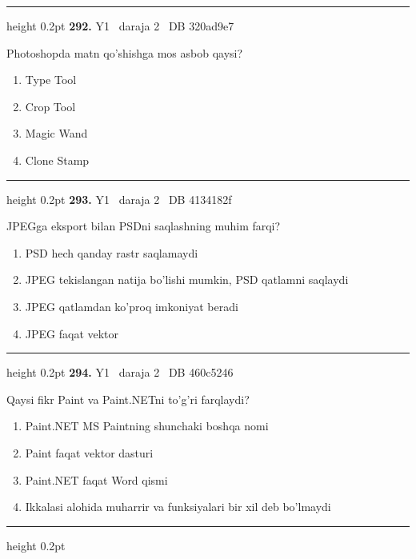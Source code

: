 \documentclass[10pt,a4paper,oneside]{article}
\begin{document}
\vspace{2mm}\hrule height 0.2pt \vspace{4mm}
\hypertarget{q292}{\textbf{\color{ink}292.}}  {\color{muted}\scriptsize Y1 \textbullet\ daraja 2 \textbullet\ DB 320ad9e7}
\par
Photoshopda matn qo'shishga mos asbob qaysi?
\begin{enumerate}[label=\Alph*),leftmargin=9mm]
\item Type Tool
\item Crop Tool
\item Magic Wand
\item Clone Stamp
\end{enumerate}
\vspace{2mm}\hrule height 0.2pt \vspace{4mm}
\hypertarget{q293}{\textbf{\color{ink}293.}}  {\color{muted}\scriptsize Y1 \textbullet\ daraja 2 \textbullet\ DB 4134182f}
\par
JPEGga eksport bilan PSDni saqlashning muhim farqi?
\begin{enumerate}[label=\Alph*),leftmargin=9mm]
\item PSD hech qanday rastr saqlamaydi
\item JPEG tekislangan natija bo'lishi mumkin, PSD qatlamni saqlaydi
\item JPEG qatlamdan ko'proq imkoniyat beradi
\item JPEG faqat vektor
\end{enumerate}
\vspace{2mm}\hrule height 0.2pt \vspace{4mm}
\hypertarget{q294}{\textbf{\color{ink}294.}}  {\color{muted}\scriptsize Y1 \textbullet\ daraja 2 \textbullet\ DB 460c5246}
\par
Qaysi fikr Paint va Paint.NETni to'g'ri farqlaydi?
\begin{enumerate}[label=\Alph*),leftmargin=9mm]
\item Paint.NET MS Paintning shunchaki boshqa nomi
\item Paint faqat vektor dasturi
\item Paint.NET faqat Word qismi
\item Ikkalasi alohida muharrir va funksiyalari bir xil deb bo'lmaydi
\end{enumerate}
\vspace{2mm}\hrule height 0.2pt \vspace{4mm}
\end{document}
